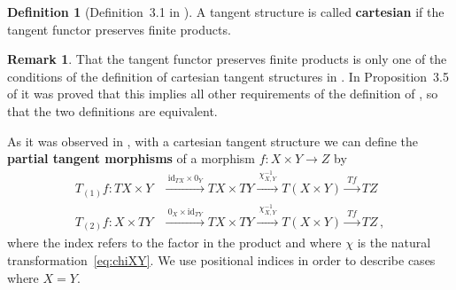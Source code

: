 \documentclass[12pt,reqno, a4paper]{amsart}
\numberwithin{equation}{section}
\theoremstyle{plain}
\theoremstyle{definition}
\newtheorem{Remark}[Theorem]{Remark}
\newtheorem{Definition}[Theorem]{Definition}
\theoremstyle{remark}
\newcommand{\id}{\mathrm{id}}
\newcommand{\Tpart}[1]{T_{(#1)}}
\begin{document}
\begin{Definition}[Definition~3.1 in \cite{AintablianBlohmann:2026}]
\label{def:CartTan}
A tangent structure is called \textbf{cartesian} if the tangent functor preserves finite products.
\end{Definition}

\begin{Remark}
That the tangent functor preserves finite products is only one of the conditions of the definition of cartesian tangent structures in \cite[Definition~2.8]{CockettCruttwell:2014}. In Proposition~3.5 of \cite{AintablianBlohmann:2026} it was proved that this implies all other requirements of the definition of \cite{CockettCruttwell:2014}, so that the two definitions are equivalent.
\end{Remark}

As it was observed in \cite[Def.~2.9]{CockettCruttwell:2014}, with a cartesian tangent structure we can define the \textbf{partial tangent morphisms} of a morphism $f: X \times Y \to Z$ by
\begin{align}
  \Tpart{1} f: TX \times Y
  &\xrightarrow{~\id_{TX} \times 0_Y~}
  TX \times TY \xrightarrow{~\chi_{X,Y}^{-1}~}
  T(X \times Y) \xrightarrow{~Tf~}
  TZ
  \\
  \label{eq:PartialT2}
  \Tpart{2} f: X \times TY
  &\xrightarrow{~0_X \times \id_{TY}~}
  TX \times TY \xrightarrow{~\chi_{X,Y}^{-1}~}
  T(X \times Y)\xrightarrow{~Tf~}
  TZ
  \,,
\end{align}
where the index refers to the factor in the product and where $\chi$ is the natural transformation~\eqref{eq:chiXY}. We use positional indices in order to describe cases where $X = Y$.
\end{document}
